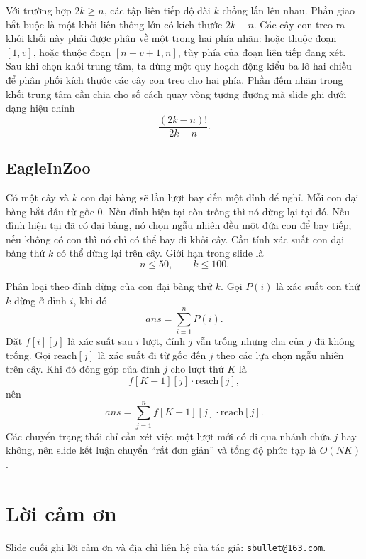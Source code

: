 \documentclass[11pt]{article}
\begin{document}
Với trường hợp \(2k\ge n\), các tập liên tiếp độ dài \(k\) chồng lấn lên nhau.
Phần giao bắt buộc là một khối liên thông lớn có kích thước \(2k-n\). Các cây
con treo ra khỏi khối này phải được phân về một trong hai phía nhãn: hoặc
thuộc đoạn \([1,v]\), hoặc thuộc đoạn \([n-v+1,n]\), tùy phía của đoạn liên
tiếp đang xét. Sau khi chọn khối trung tâm, ta dùng một quy hoạch động kiểu
ba lô hai chiều để phân phối kích thước các cây con treo cho hai phía. Phần
đếm nhãn trong khối trung tâm cần chia cho số cách quay vòng tương đương mà
slide ghi dưới dạng hiệu chỉnh
\[
  \frac{(2k-n)!}{2k-n}.
\]

\subsection{EagleInZoo}

Có một cây và \(k\) con đại bàng sẽ lần lượt bay đến một đỉnh để nghỉ. Mỗi con
đại bàng bắt đầu từ gốc \(0\). Nếu đỉnh hiện tại còn trống thì nó dừng lại tại
đó. Nếu đỉnh hiện tại đã có đại bàng, nó chọn ngẫu nhiên đều một đứa con để
bay tiếp; nếu không có con thì nó chỉ có thể bay đi khỏi cây. Cần tính xác
suất con đại bàng thứ \(k\) có thể dừng lại trên cây. Giới hạn trong slide là
\[
  n\le 50,\qquad k\le 100.
\]

Phân loại theo đỉnh dừng của con đại bàng thứ \(k\). Gọi \(P(i)\) là xác suất
con thứ \(k\) dừng ở đỉnh \(i\), khi đó
\[
  ans=\sum_{i=1}^{n} P(i).
\]
Đặt \(f[i][j]\) là xác suất sau \(i\) lượt, đỉnh \(j\) vẫn trống nhưng cha của
\(j\) đã không trống. Gọi \(\mathrm{reach}[j]\) là xác suất đi từ gốc đến
\(j\) theo các lựa chọn ngẫu nhiên trên cây. Khi đó đóng góp của đỉnh \(j\)
cho lượt thứ \(K\) là
\[
  f[K-1][j]\cdot \mathrm{reach}[j],
\]
nên
\[
  ans=\sum_{j=1}^{n} f[K-1][j]\cdot \mathrm{reach}[j].
\]
Các chuyển trạng thái chỉ cần xét việc một lượt mới có đi qua nhánh chứa
\(j\) hay không, nên slide kết luận chuyển ``rất đơn giản'' và tổng độ phức
tạp là \(O(NK)\).

\section*{Lời cảm ơn}

Slide cuối ghi lời cảm ơn và địa chỉ liên hệ của tác giả:
\texttt{sbullet@163.com}.
\end{document}
